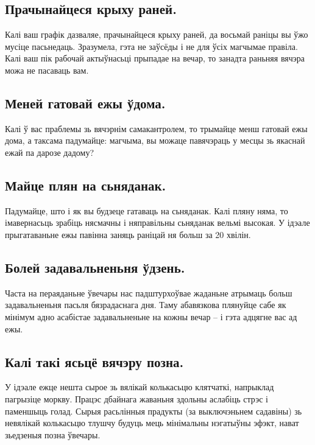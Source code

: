 \subsection{Прачынайцеся крыху раней.}
Калі ваш графік дазваляе, прачынайцеся крыху раней, да восьмай раніцы вы ўжо мусіце пасьнедаць. Зразумела, гэта не заўсёды і не для ўсіх магчымае правіла. Калі ваш пік рабочай актыўнасьці прыпадае на вечар, то занадта раньняя вячэра можа не пасаваць вам.

\subsection{Меней гатовай ежы ўдома.}
Калі ў вас праблемы зь вячэрнім самакантролем, то трымайце менш гатовай ежы дома, а таксама падумайце: магчыма, вы можаце павячэраць у месцы зь якаснай ежай па дарозе дадому?

\subsection{Майце плян на сьняданак.}
Падумайце, што і як вы будзеце гатаваць на сьняданак. Калі пляну няма, то імавернасьць зрабіць нясмачны і няправільны сьняданак вельмі высокая. У ідэале прыгатаваньне ежы павінна заняць раніцай ня больш за 20 хвілін.

\subsection{Болей задавальненьня ўдзень.}
Часта на пераяданьне ўвечары нас падштурхоўвае жаданьне атрымаць больш задавальненьня пасьля бязрадаснага дня. Таму абавязкова плянуйце сабе як мінімум адно асабістае задавальненьне на кожны вечар – і гэта адцягне вас ад ежы.

\subsection{Калі такі ясьцё вячэру позна.}
У ідэале ежце нешта сырое зь вялікай колькасьцю клятчаткі, напрыклад пагрызіце моркву. Працэс дбайнага жаваньня здольны аслабіць стрэс і паменшыць голад. Сырыя расьлінныя прадукты (за выключэньнем садавіны) зь невялікай колькасьцю тлушчу будуць мець мінімальны нэгатыўны эфэкт, нават зьедзеныя позна ўвечары.
